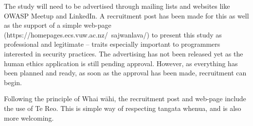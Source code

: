\par The study will need to be advertised through mailing lists and websites like OWASP Meetup and LinkedIn. A recruitment post has been made for this as well as the support of a simple web-page (https://homepages.ecs.vuw.ac.nz/~sajwanlava/) \cite{webpage} to present this study as professional and legitimate – traits especially important to programmers interested in security practices. The advertising has not been released yet as the human ethics application is still pending approval. However, as everything has been planned and ready, as soon as the approval has been made, recruitment can begin. 
\newline
\par Following the principle of Whai wāhi, the recruitment post and web-page include the use of Te Reo. This is simple way of respecting tangata whenua, and is also more welcoming. 







